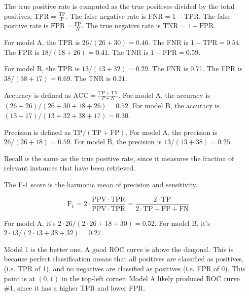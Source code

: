 \documentclass[11pt,largemargins, anonymous]{homework}
\begin{document}
\begin{arabicparts}
    \questionpart

    The true positive rate is computed as the true positives divided by the total positives,
    \( \mathrm{TPR} = \frac{\mathrm{TP}}{\mathrm{P}} \).
    The false negative rate is \( \mathrm{FNR} = 1 - \mathrm{TPR} \).
    The false positive rate is \( \mathrm{FPR} = \frac{\mathrm{FP}}{N} \).
    The true negative rate is \( \mathrm{TNR} = 1 - \mathrm{FPR} \).

    For model A, the TPR is $26/(26 + 30) = 0.46$.
    The FNR is $ 1 - \mathrm{TPR} = 0.54 $.
    The FPR is $ 18 / (18 + 26) = 0.41 $.
    The TNR is $ 1 - \mathrm{FPR} = 0.59 $.

    For model B, the TPR is $ 13 / (13 + 32) = 0.29 $.
    The FNR is 0.71.
    The FPR is $ 38 / (38 + 17) =  0.69 $.
    The TNR is $ 0.21 $.

    \questionpart

    Accuracy is defined as $ \mathrm{ACC} = \frac{\mathrm{TP} + \mathrm{TN}}{P + N} $.
    For model A, the accuracy is $ (26 + 26) / (26 + 30 + 18 + 26) = 0.52 $.
    For model B, the accuracy is $ (13 + 17) / (13  + 32 + 38 + 17) = 0.30 $.

    Precision is defined as $ \mathrm{TP} / (\mathrm{TP} + \mathrm{FP}) $.
    For model A, the precision is $ 26 / (26 + 18) = 0.59 $.
    For model B, the precision is $ 13 / (13 + 38) = 0.25 $.

    Recall is the same as the true positive rate,
    since it measures the fraction of relevant instances that have been retrieved.

    The F-1 score is the harmonic mean of precision and sensitivity.

    \[ \mathrm{F_1} = 2 \cdot \frac{\mathrm{PPV} \cdot \mathrm{TPR}}{\mathrm{PPV} \cdot \mathrm{TPR}} = \frac{2 \cdot \mathrm{TP}}{2 \cdot \mathrm{TP} + \mathrm{FP} + \mathrm{FN}} \]

    For model A, it's $ 2 \cdot 26 / (2 \cdot 26 + 18 + 30) = 0.52 $.
    For model B, it's $ 2 \cdot 13 / (2 \cdot 13 + 38 + 32) = 0.27 $.

\end{arabicparts}

\question

Model 1 is the better one.
A good ROC curve is above the diagonal.
This is because perfect classification means that all positives are classified as positives,
(i.e. TPR of 1), and no negatives are classified as positives (i.e. FPR of 0).
This point is at $(0, 1)$ in the top-left corner.
Model A likely produced ROC curve \#1,
since it has a higher TPR and lower FPR.
\end{document}
